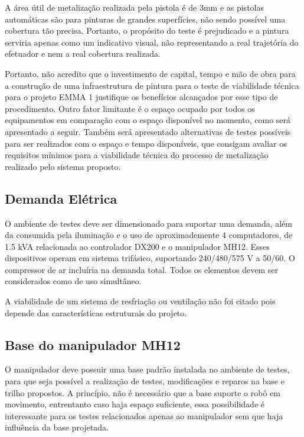 A área útil de metalização realizada pela pistola é de 3mm e as pistolas automáticas são para pinturas de grandes 
superfícies, não sendo possível uma cobertura tão precisa. Portanto, o propósito
do teste é prejudicado e a pintura serviria apenas como um indicativo visual,
não representando a real trajetória do efetuador e nem a real cobertura
realizada.

Portanto, não acredito que o investimento de capital, tempo e mão de obra para a construção de uma infraestrutura 
de pintura para o teste de viabilidade técnica para o projeto EMMA 1 justifique os benefícios alcançados por esse 
tipo de procedimento. Outro fator limitante é o espaço ocupado por todos os equipamentos em comparação com o 
espaço disponível no momento, como será apresentado a seguir. Também será apresentado alternativas de testes 
possíveis para ser realizados com o espaço e tempo disponíveis, que consigam avaliar os requisitos mínimos para 
a viabilidade técnica do processo de metalização realizado pelo sistema proposto.  


\subsection{Demanda Elétrica}

O ambiente de testes deve ser dimensionado para suportar uma demanda, além da
consumida pela iluminação e o uso de aproximademente 4 computadores, de 1.5 kVA
relacionada ao controlador DX200 e o manipulador MH12. 
Esses dispositivos operam em sistema trifásico, suportando 240/480/575 V a 50/60. 
O compressor de ar incluíria %
na demanda total.
Todos os elementos devem ser considerados como de uso
simultâneo. 

A viabilidade de um sistema de resfriação ou ventilação não foi citado pois
depende das características estruturais do projeto. 

\subsection{Base do manipulador MH12}
O manipulador deve possuir uma base padrão instalada no ambiente de testes, para
que seja possível a realização de testes, modificações e reparos na base e
trilho propostos. 
A princípio, não é necessário que a base suporte o robô em
movimento, entrentanto caso haja espaço suficiente, essa possibilidade é
interessante para os testes relacionados apenas ao manipulador sem que haja
influência da base projetada.


